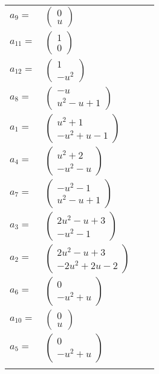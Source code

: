 \documentclass[1p]{elsarticle_modified}
\theoremstyle{definition}
\begin{document}
\begin{tabular}{m{7pt} m{180pt} m{7pt} m{180pt} }
\flushright $a_{9}=$&$\begin{pmatrix}0\\u\end{pmatrix}$ \\
\flushright $a_{11}=$&$\begin{pmatrix}1\\0\end{pmatrix}$ \\
\flushright $a_{12}=$&$\begin{pmatrix}1\\- u^2\end{pmatrix}$ \\
\flushright $a_{8}=$&$\begin{pmatrix}- u\\u^2- u+1\end{pmatrix}$ \\
\flushright $a_{1}=$&$\begin{pmatrix}u^2+1\\- u^2+u-1\end{pmatrix}$ \\
\flushright $a_{4}=$&$\begin{pmatrix}u^2+2\\- u^2- u\end{pmatrix}$ \\
\flushright $a_{7}=$&$\begin{pmatrix}- u^2-1\\u^2- u+1\end{pmatrix}$ \\
\flushright $a_{3}=$&$\begin{pmatrix}2 u^2- u+3\\- u^2-1\end{pmatrix}$ \\
\flushright $a_{2}=$&$\begin{pmatrix}2 u^2- u+3\\-2 u^2+2 u-2\end{pmatrix}$ \\
\flushright $a_{6}=$&$\begin{pmatrix}0\\- u^2+u\end{pmatrix}$ \\
\flushright $a_{10}=$&$\begin{pmatrix}0\\u\end{pmatrix}$ \\
\flushright $a_{5}=$&$\begin{pmatrix}0\\- u^2+u\end{pmatrix}$\\&\end{tabular}
\end{document}
